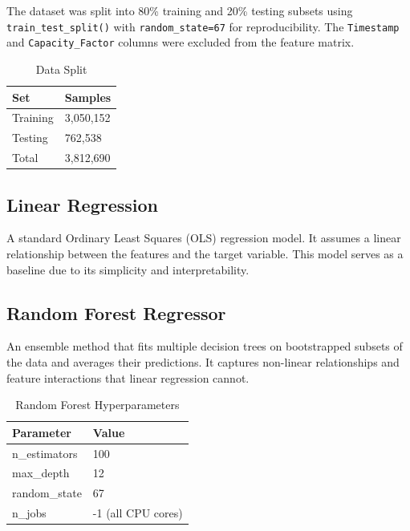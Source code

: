 \documentclass[12pt, a4paper]{article}
\begin{document}
The dataset was split into 80\% training and 20\% testing subsets using \texttt{train\_test\_split()} with \texttt{random\_state=67} for reproducibility. The \texttt{Timestamp} and \texttt{Capacity\_Factor} columns were excluded from the feature matrix.

\begin{table}[H]
    \centering
    \caption{Data Split}
    \begin{tabular}{ll}
        \toprule
        \textbf{Set} & \textbf{Samples} \\
        \midrule
        Training & 3,050,152 \\
        Testing & 762,538 \\
        Total & 3,812,690 \\
        \bottomrule
    \end{tabular}
\end{table}

\subsection{Linear Regression}

A standard Ordinary Least Squares (OLS) regression model. It assumes a linear relationship between the features and the target variable. This model serves as a baseline due to its simplicity and interpretability.

\clearpage
\subsection{Random Forest Regressor}

An ensemble method that fits multiple decision trees on bootstrapped subsets of the data and averages their predictions. It captures non-linear relationships and feature interactions that linear regression cannot.

\begin{table}[H]
    \centering
    \caption{Random Forest Hyperparameters}
    \begin{tabular}{ll}
        \toprule
        \textbf{Parameter} & \textbf{Value} \\
        \midrule
        n\_estimators & 100 \\
        max\_depth & 12 \\
        random\_state & 67 \\
        n\_jobs & -1 (all CPU cores) \\
        \bottomrule
    \end{tabular}
\end{table}
\end{document}

